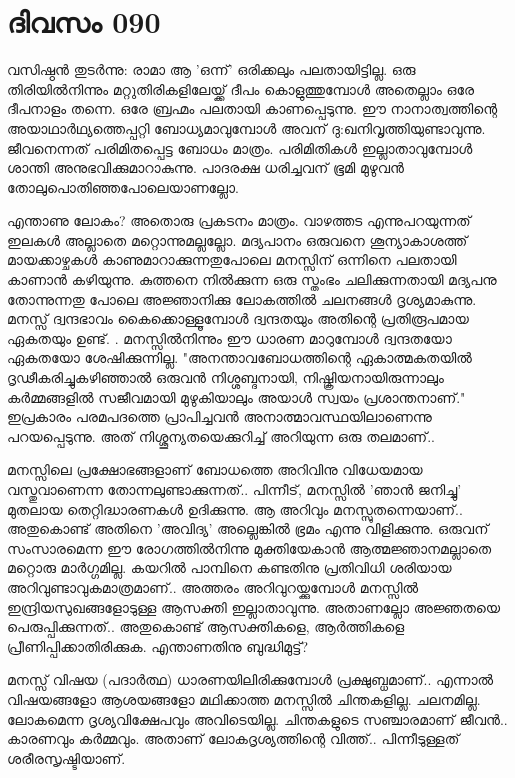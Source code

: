  
\section{ദിവസം 090}


വസിഷ്ഠന്‍ തുടര്‍ന്നു: രാമാ ആ 'ഒന്ന്' ഒരിക്കലും പലതായിട്ടില്ല. ഒരു തിരിയില്‍നിന്നും മറ്റുതിരികളിലേയ്ക്ക്‌ ദീപം കൊളുത്തുമ്പോള്‍ അതെല്ലാം ഒരേ ദീപനാളം തന്നെ. ഒരേ ബ്രഹ്മം പലതായി കാണപ്പെടുന്നു. ഈ നാനാത്വത്തിന്റെ അയാഥാര്‍ഥ്യത്തെപ്പറ്റി ബോധ്യമാവുമ്പോള്‍ അവന്‌ ദു:ഖനിവൃത്തിയുണ്ടാവുന്നു. ജീവനെന്നത്‌ പരിമിതപ്പെട്ട ബോധം മാത്രം. പരിമിതികള്‍ ഇല്ലാതാവുമ്പോള്‍ ശാന്തി അനുഭവിക്കുമാറാകുന്നു. പാദരക്ഷ ധരിച്ചവന്‌ ഭൂമി മുഴുവന്‍ തോലുപൊതിഞ്ഞപോലെയാണല്ലോ.

എന്താണു ലോകം? അതൊരു പ്രകടനം മാത്രം. വാഴത്തട എന്നുപറയുന്നത്‌ ഇലകള്‍ അല്ലാതെ മറ്റൊന്നുമല്ലല്ലോ. മദ്യപാനം ഒരുവനെ ശൂന്യാകാശത്ത്‌ മായക്കാഴ്ചകള്‍ കാണുമാറാക്കുന്നതുപോലെ മനസ്സിന്‌ ഒന്നിനെ പലതായി കാണാന്‍ കഴിയുന്നു. കുത്തനെ നില്‍ക്കുന്ന ഒരു സ്തംഭം ചലിക്കുന്നതായി മദ്യപനു തോന്നുന്നതു പോലെ അജ്ഞാനിക്കു ലോകത്തില്‍ ചലനങ്ങള്‍ ദൃശ്യമാകുന്നു. മനസ്സ്‌ ദ്വന്ദഭാവം കൈക്കൊള്ളൂമ്പോള്‍ ദ്വന്ദതയും അതിന്റെ പ്രതിരൂപമായ ഏകതയും ഉണ്ട്‌. . മനസ്സില്‍നിന്നും ഈ ധാരണ മാറുമ്പോള്‍ ദ്വന്ദതയോ ഏകതയോ ശേഷിക്കുന്നില്ല. "അനന്താവബോധത്തിന്റെ ഏകാത്മകതയില്‍ ദൃഢീകരിച്ചുകഴിഞ്ഞാല്‍ ഒരുവന്‍ നിശ്ശബ്ദനായി, നിഷ്ക്രിയനായിരുന്നാലും കര്‍മ്മങ്ങളില്‍ സജീവമായി മുഴുകിയാലും അയാള്‍ സ്വയം പ്രശാന്തനാണ്‌." ഇപ്രകാരം പരമപദത്തെ പ്രാപിച്ചവന്‍ അനാത്മാവസ്ഥയിലാണെന്നു പറയപ്പെടുന്നു. അത്‌ നിശ്ശൂന്യതയെക്കുറിച്ച്‌ അറിയുന്ന ഒരു തലമാണ്‌..

മനസ്സിലെ പ്രക്ഷോഭങ്ങളാണ്‌ ബോധത്തെ അറിവിനു വിധേയമായ വസ്തുവാണെന്ന തോന്നലുണ്ടാക്കുന്നത്‌.. പിന്നീട്‌, മനസ്സില്‍ 'ഞാന്‍ ജനിച്ചു' മുതലായ തെറ്റിദ്ധാരണകള്‍ ഉദിക്കുന്നു. ആ അറിവും മനസ്സുതന്നെയാണ്‌.. അതുകൊണ്ട്‌ അതിനെ 'അവിദ്യ' അല്ലെങ്കില്‍ ഭ്രമം എന്നു വിളിക്കുന്നു. ഒരുവന്‌ സംസാരമെന്ന ഈ രോഗത്തില്‍നിന്നു മുക്തിയേകാന്‍ ആത്മജ്ഞാനമല്ലാതെ മറ്റൊരു മാര്‍ഗ്ഗമില്ല. കയറില്‍ പാമ്പിനെ കണ്ടതിനു പ്രതിവിധി ശരിയായ അറിവുണ്ടാവുകമാത്രമാണ്‌.. അത്തരം അറിവുറയ്ക്കുമ്പോള്‍ മനസ്സില്‍ ഇന്ദ്രിയസുഖങ്ങളോടുള്ള ആസക്തി ഇല്ലാതാവുന്നു. അതാണല്ലോ അജ്ഞതയെ പെരുപ്പിക്കുന്നത്‌.. അതുകൊണ്ട്‌ ആസക്തികളെ, ആര്‍ത്തികളെ പ്രീണിപ്പിക്കാതിരിക്കുക. എന്താണതിനു ബുദ്ധിമുട്ട്‌?

മനസ്സ്‌ വിഷയ (പദാര്‍ത്ഥ) ധാരണയിലിരിക്കുമ്പോള്‍ പ്രക്ഷുബ്ധമാണ്‌.. എന്നാല്‍ വിഷയങ്ങളോ ആശയങ്ങളോ മഥിക്കാത്ത മനസ്സില്‍ ചിന്തകളില്ല. ചലനമില്ല. ലോകമെന്ന ദൃശ്യവിക്ഷേപവും അവിടെയില്ല. ചിന്തകളുടെ സഞ്ചാരമാണ്‌ ജീവന്‍.. കാരണവും കര്‍മ്മവും. അതാണ്‌ ലോകദൃശ്യത്തിന്റെ വിത്ത്‌.. പിന്നീടുള്ളത്‌ ശരീരസൃഷ്ടിയാണ്‌.

